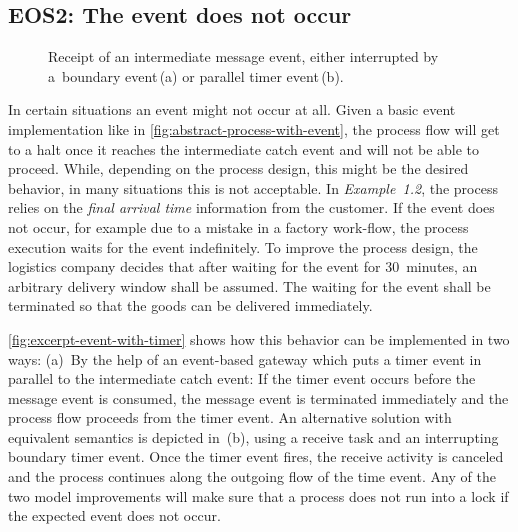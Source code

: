 \subsection*{EOS2: The event does not occur}

\begin{figure}[bth]
	\myfloatalign
	 \quad
	\caption{Receipt of an intermediate message event, either interrupted by a~boundary event\,(a) or parallel timer event\,(b).}
	\label{fig:excerpt-event-with-timer}
\end{figure}

In certain situations an event might not occur at all. Given a basic event implementation like in \autoref{fig:abstract-process-with-event}, the process flow will get to a halt once it reaches the intermediate catch event and will not be able to proceed. While, depending on the process design, this might be the desired behavior, in many situations this is not acceptable.
In \textit{Example~1.2}, the process relies on the \textit{final arrival time} information from the customer. If the event does not occur, for example due to a mistake in a factory work-flow, the process execution waits for the event indefinitely.
To improve the process design, the logistics company decides that after waiting for the event for 30~minutes, an arbitrary delivery window shall be assumed. The waiting for the event shall be terminated so that the goods can be delivered immediately.

\autoref{fig:excerpt-event-with-timer} shows how this behavior can be implemented in two ways: (a)~By the help of an event-based gateway which puts a timer event in parallel to the intermediate catch event: If the timer event occurs before the message event is consumed, the message event is terminated immediately and the process flow proceeds from the timer event.
An alternative solution with equivalent semantics is depicted in~(b), using a receive task and an interrupting boundary timer event. Once the timer event fires, the receive activity is canceled and the process continues along the outgoing flow of the time event.
Any of the two model improvements will make sure that a process does not run into a lock if the expected event does not occur.


